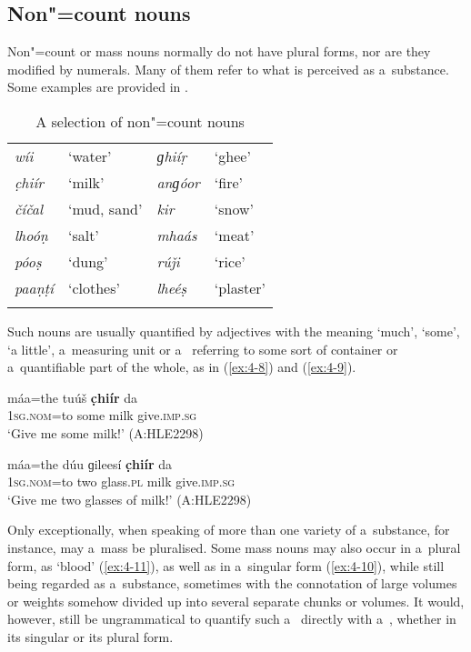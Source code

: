 \subsection{Non"=count nouns}
\label{subsec:4-4-1}


Non"=count or mass nouns normally do not have plural forms, nor are they modified by numerals. Many of them refer to what is perceived as a~substance. Some examples are provided in .



\begin{table}[H]
\caption{A selection of non"=count nouns}
\begin{tabularx}{\textwidth}{ Q Q Q Q }
\lsptoprule
\textit{wíi} &
`water' &
\textit{ɡhiíṛ} &
`ghee'\\
\textit{c̣hiír} &
`milk' &
\textit{anɡóor} &
`fire'\\
\textit{číčal} &
`mud, sand' &
\textit{kir} &
`snow'\\
\textit{lhoóṇ} &
`salt' &
\textit{mhaás} &
`meat'\\
\textit{póoṣ} &
`dung' &
\textit{rúǰi} &
`rice'\\
\textit{paaṇṭí} &
`clothes' &
\textit{lheéṣ} &
`plaster'\\\lspbottomrule
\end{tabularx}
\label{tab:4-ncount}
\end{table}

Such nouns are usually quantified by adjectives with the meaning `much', `some', `a little', a~measuring unit or a~ referring to some sort of container or a~quantifiable part of the whole, as in (\ref{ex:4-8}) and (\ref{ex:4-9}). 

\begin{exe}
\ex
\label{ex:4-8}
\gll máa=the tuúš \textbf{c̣hiír} da \\
	\textsc{1sg.nom}=to some milk give.\textsc{imp.sg} \\
\glt `Give me some milk!' (A:HLE2298)
\end{exe}

\begin{exe}
\ex
\label{ex:4-9}
\gll máa=the dúu ɡileesí \textbf{c̣hiír} da \\
	\textsc{1sg.nom}=to two glass.\textsc{pl} milk give.\textsc{imp.sg} \\
\glt `Give me two glasses of milk!' (A:HLE2298)
\end{exe}

Only exceptionally, when speaking of more than one variety of a~substance, for instance, may a~mass  be pluralised. Some mass nouns may also occur in a~plural form, as `blood' (\ref{ex:4-11}), as well as in a~singular form (\ref{ex:4-10}), while still being regarded as a~substance, sometimes with the connotation of large volumes or weights somehow divided up into several separate chunks or volumes. It would, however, still be ungrammatical to quantify such a~ directly with a~, whether in its singular or its plural form.

